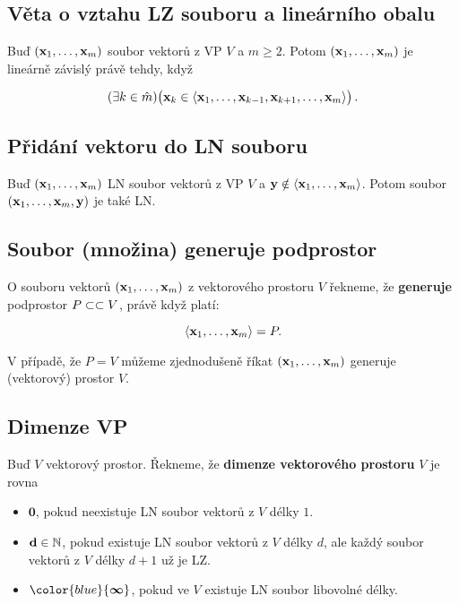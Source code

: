 \subsection*{Věta o vztahu LZ souboru a lineárního obalu}

Buď $(\mathbf{x}_{1},\dots,\mathbf{x}_{m})$ soubor vektorů z VP $V$ a $m\geq 2$. Potom
$(\mathbf{x}_{1},\dots,\mathbf{x}_{m})$ je lineárně závislý právě tehdy, když

\[ (\exists k\in\hat{m})\big(\mathbf{x}_{k}\in\langle \mathbf{x}_{1},\dots,\mathbf{x}_{k-1},\mathbf{x}_{k+1},\dots,\mathbf{x}_{m} \rangle\big) \,. \]

\subsection*{Přidání vektoru do LN souboru}

Buď $(\mathbf{x}_{1},\dots,\mathbf{x}_{m})$ LN soubor vektorů z VP $V$ a $\mathbf{y}\notin\langle
      \mathbf{x}_{1},\dots,\mathbf{x}_{m} \rangle $. Potom soubor $(\mathbf{x}_{1},\dots,\mathbf{x}_{m},\mathbf{y})$ je
také LN.

\subsection*{Soubor (množina) generuje podprostor}

O souboru vektorů $(\mathbf{x}_1,\dots,\mathbf{x}_m)$ z vektorového prostoru $V$ řekneme, že
\textbf{generuje} podprostor $P\subset \subset V$, právě když platí:

\[ \langle \mathbf{x}_1,\dots,\mathbf{x}_m \rangle =P. \]

\noindent V případě, že $P=V$ můžeme zjednodušeně říkat $(\mathbf{x}_1,\dots,\mathbf{x}_m)$ generuje
(vektorový) prostor $V$.

\subsection*{Dimenze VP}

Buď $V$ vektorový prostor. Řekneme, že \textbf{dimenze vektorového prostoru}
$V$ je rovna

\begin{itemize}
      \item $\mathbf 0$, pokud neexistuje LN soubor vektorů z $V$ délky $1$.
      \item $\mathbf d\in \mathbb{N}$, pokud existuje LN soubor vektorů z $V$ délky $d$, ale každý soubor vektorů z $V$ délky $d+1$ už je LZ.
      \item $\color{blue}{\boldsymbol{\infty}}$, pokud ve $V$ existuje LN soubor libovolné délky.
\end{itemize}

